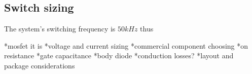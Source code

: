 \subsection{Switch sizing} \label{switch_sizing}

The system's switching frequency is $50 kHz$ thus 

*mosfet it is
*voltage and current sizing 
*commercial component choosing
*on resistance
*gate capacitance
*body diode
*conduction losses?
*layout and package considerations

